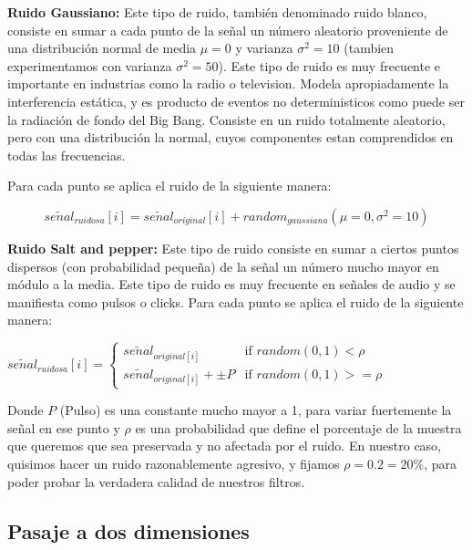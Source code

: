 \begin{itemize}
	\begin{item}
		{\bf Ruido Gaussiano:} Este tipo de ruido, tambi\'en denominado ruido
blanco, consiste en sumar a cada punto de la se\~nal un n\'umero aleatorio
proveniente de una distribuci\'on normal de media $\mu = 0$ y varianza $\sigma^2=10$ (tambien
experimentamos con varianza $\sigma^2=50$). 
Este tipo de ruido es muy frecuente e importante en industrias como la radio o television.
Modela apropiadamente la interferencia est\'atica, y es producto de eventos no deterministicos como 
puede ser la radiaci\'on de fondo del Big Bang. Consiste en un ruido totalmente aleatorio, pero con 
una distribuci\'on la normal, cuyos componentes estan comprendidos en todas las frecuencias.

 	Para cada punto se aplica el ruido de la siguiente manera:

    $$se\widetilde{n}al_{ruidosa}[i] = se\widetilde{n}al_{original}[i] + random_{gaussiana}(\mu=0, \sigma^2=10)$$


	\end{item}

	\begin{item}
		{\bf Ruido Salt and pepper:} Este tipo de ruido consiste en sumar a ciertos puntos dispersos (con probabilidad peque\~na) 
de la se\~nal un n\'umero mucho mayor en m\'odulo a la media. Este tipo de ruido es muy 
frecuente en se\~nales de audio y se manifiesta como pulsos o clicks.
Para cada punto se aplica el ruido de la siguiente manera:

    $se\widetilde{n}al_{ruidosa}[i] =
    \begin{cases}
        se\widetilde{n}al_{original[i]}  & \mbox{if } random(0,1)< \rho \\
        se\widetilde{n}al_{original[i]} + \pm P  & \mbox{if } random(0,1) >= \rho         
    \end{cases}
        $\\
        \bigskip 
	\end{item}
Donde $P$ (Pulso) es una constante mucho mayor a 1, para variar fuertemente la se\~nal en ese punto
y $\rho$ es una probabilidad que define el porcentaje de la muestra que queremos que sea preservada 
y no afectada por el ruido. En nuestro caso, quisimos hacer un ruido razonablemente
agresivo, y fijamos $\rho = 0.2 = 20\%$, para poder probar la verdadera calidad 
de nuestros filtros.
\end{itemize}

\subsection{Pasaje a dos dimensiones}

